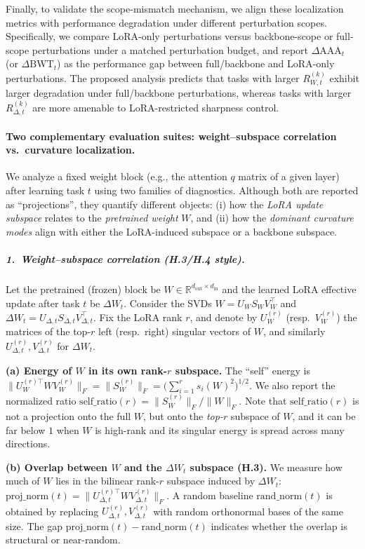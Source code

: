 \documentclass{article}
\theoremstyle{plain}
\theoremstyle{definition}
\theoremstyle{remark}
\begin{document}
Finally, to validate the scope-mismatch mechanism, we align these localization metrics with performance degradation under different perturbation scopes. Specifically, we compare LoRA-only perturbations versus backbone-scope or full-scope perturbations under a matched perturbation budget, and report $\Delta\mathrm{AAA}_t$ (or $\Delta\mathrm{BWT}_t$) as the performance gap between full/backbone and LoRA-only perturbations. The proposed analysis predicts that tasks with larger $R_{W,t}^{(k)}$ exhibit larger degradation under full/backbone perturbations, whereas tasks with larger $R_{\Delta,t}^{(k)}$ are more amenable to LoRA-restricted sharpness control.

\paragraph{Two complementary evaluation suites: weight--subspace correlation vs.\ curvature localization.}
We analyze a fixed weight block (e.g., the attention $q$ matrix of a given layer) after learning task $t$ using two families of diagnostics. Although both are reported as ``projections'', they quantify different objects: (i) how the \emph{LoRA update subspace} relates to the \emph{pretrained weight} $W$, and (ii) how the \emph{dominant curvature modes} align with either the LoRA-induced subspace or a backbone subspace.

\subparagraph{1.\ Weight--subspace correlation (H.3/H.4 style).}
Let the pretrained (frozen) block be $W\in\mathbb{R}^{d_{\mathrm{out}}\times d_{\mathrm{in}}}$ and the learned LoRA effective update after task $t$ be $\Delta W_t$. Consider the SVDs
$W = U_W S_W V_W^\top$
and
$\Delta W_t = U_{\Delta,t} S_{\Delta,t} V_{\Delta,t}^\top$.
Fix the LoRA rank $r$, and denote by $U_W^{(r)}$ (resp.\ $V_W^{(r)}$) the matrices of the top-$r$ left (resp.\ right) singular vectors of $W$, and similarly $U_{\Delta,t}^{(r)},V_{\Delta,t}^{(r)}$ for $\Delta W_t$.

\textbf{(a) Energy of $W$ in its own rank-$r$ subspace.}
The ``self'' energy is
$\|U_W^{(r)\top} W V_W^{(r)}\|_F
= \|S_W^{(r)}\|_F
= \big(\sum_{i=1}^r s_i(W)^2\big)^{1/2}$.
We also report the normalized ratio
$\mathrm{self\_ratio}(r)=\|S_W^{(r)}\|_F/\|W\|_F$.
Note that $\mathrm{self\_ratio}(r)$ is not a projection onto the full $W$, but onto the \emph{top-$r$} subspace of $W$, and it can be far below $1$ when $W$ is high-rank and its singular energy is spread across many directions.

\textbf{(b) Overlap between $W$ and the $\Delta W_t$ subspace (H.3).}
We measure how much of $W$ lies in the bilinear rank-$r$ subspace induced by $\Delta W_t$:
$\mathrm{proj\_norm}(t)=\|U_{\Delta,t}^{(r)\top} W V_{\Delta,t}^{(r)}\|_F$.
A random baseline $\mathrm{rand\_norm}(t)$ is obtained by replacing $U_{\Delta,t}^{(r)},V_{\Delta,t}^{(r)}$ with random orthonormal bases of the same size. The gap $\mathrm{proj\_norm}(t)-\mathrm{rand\_norm}(t)$ indicates whether the overlap is structural or near-random.
\end{document}
